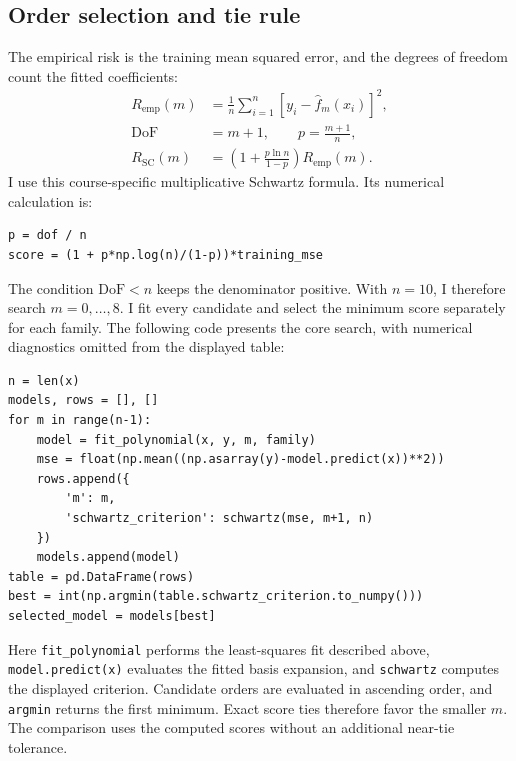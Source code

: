 \documentclass[11pt,a4paper]{article}
\begin{document}
\subsection*{Order selection and tie rule}
The empirical risk is the training mean squared error, and the degrees of freedom count the fitted coefficients:
\begin{align}
R_{\mathrm{emp}}(m)&=\frac1n\sum_{i=1}^n[y_i-\widehat f_m(x_i)]^2,\\
\mathrm{DoF}&=m+1,\qquad p=\frac{m+1}{n},\\
R_{\mathrm{SC}}(m)&=\left(1+\frac{p\ln n}{1-p}\right)R_{\mathrm{emp}}(m).
\end{align}
I use this course-specific multiplicative Schwartz formula. Its numerical calculation is:
\par\addvspace{4pt}
\noindent\begin{minipage}{\linewidth}
\begin{lstlisting}[style=pythoncode,caption={Computing the analytic Schwartz score.}]
p = dof / n
score = (1 + p*np.log(n)/(1-p))*training_mse
\end{lstlisting}
\end{minipage}\par\addvspace{4pt}
The condition $\mathrm{DoF}<n$ keeps the denominator positive. With $n=10$, I therefore search $m=0,\ldots,8$. I fit every candidate and select the minimum score separately for each family. The following code presents the core search, with numerical diagnostics omitted from the displayed table:
\par\addvspace{4pt}
\noindent\begin{minipage}{\linewidth}
\begin{lstlisting}[style=pythoncode,caption={Fitting candidate orders and selecting the minimum Schwartz score.}]
n = len(x)
models, rows = [], []
for m in range(n-1):
    model = fit_polynomial(x, y, m, family)
    mse = float(np.mean((np.asarray(y)-model.predict(x))**2))
    rows.append({
        'm': m,
        'schwartz_criterion': schwartz(mse, m+1, n)
    })
    models.append(model)
table = pd.DataFrame(rows)
best = int(np.argmin(table.schwartz_criterion.to_numpy()))
selected_model = models[best]
\end{lstlisting}
\end{minipage}\par\addvspace{4pt}
Here \texttt{fit\_polynomial} performs the least-squares fit described above, \texttt{model.predict(x)} evaluates the fitted basis expansion, and \texttt{schwartz} computes the displayed criterion. Candidate orders are evaluated in ascending order, and \texttt{argmin} returns the first minimum. Exact score ties therefore favor the smaller $m$. The comparison uses the computed scores without an additional near-tie tolerance.
\end{document}
